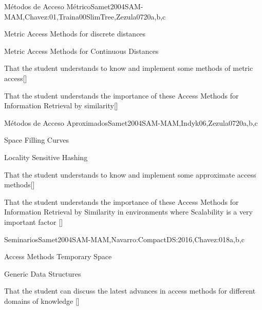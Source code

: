 \begin{syllabus}
\begin{unit}{Métodos de Acceso Métrico}{}{Samet2004SAM-MAM,Chavez:01,Traina00SlimTree,Zezula07}{20}{a,b,c}
   \begin{topics}
         \item Metric Access Methods for discrete distances
         \item Metric Access Methods for Continuous Distances
   \end{topics}
   \begin{learningoutcomes}
         \item That the student understands to know and implement some methods of metric access[\Usage]
         \item That the student understands the importance of these Access Methods for Information Retrieval by similarity[\Usage]
   \end{learningoutcomes}
\end{unit}

\begin{unit}{Métodos de Acceso Aproximados}{}{Samet2004SAM-MAM,Indyk06,Zezula07}{20}{a,b,c}
   \begin{topics}
         \item Space Filling Curves
         \item Locality Sensitive Hashing
   \end{topics}
   \begin{learningoutcomes}
         \item That the student understands to know and implement some approximate access methods[\Usage]
         \item That the student understands the importance of these Access Methods for Information Retrieval by Similarity in environments where Scalability is a very important factor [\Usage]
   \end{learningoutcomes}
\end{unit}

\begin{unit}{Seminarios}{}{Samet2004SAM-MAM,Navarro:CompactDS:2016,Chavez:01}{8}{a,b,c}
	\begin{topics}
         \item Access Methods Temporary Space
         \item Generic Data Structures
   \end{topics}
   \begin{learningoutcomes}
         \item That the student can discuss the latest advances in access methods for different domains of knowledge [\Usage]
   \end{learningoutcomes}
\end{unit}

\begin{coursebibliography}
\end{coursebibliography}

\end{syllabus}
